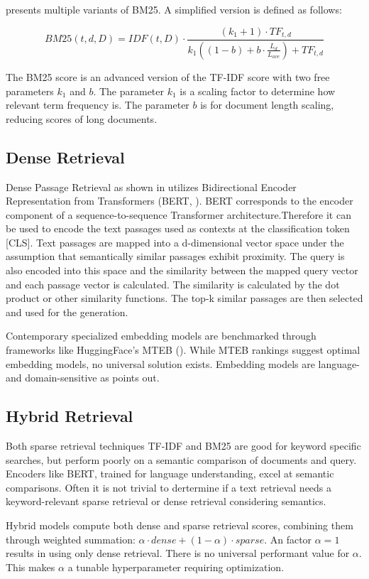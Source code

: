 \citet{Manning.2009} presents multiple variants of BM25. A simplified version is defined as follows:

$$BM25(t, d, D) = IDF(t, D) \cdot \frac{(k_1 + 1) \cdot TF_{t, d}}{k_1((1-b)+b \cdot \frac{L_d}{L_{ave}}) + TF_{t, d}}$$


The BM25 score is an advanced version of the TF-IDF score with two free parameters $k_1$ and $b$. The parameter $k_1$ is a scaling factor to determine how relevant term frequency is. The parameter $b$ is for document length scaling, reducing scores of long documents. 

\subsection{Dense Retrieval}
\label{sec:dense_retrieval}

Dense Passage Retrieval as shown in \citet{karpukhin2020densepassageretrievalopendomain} utilizes Bidirectional Encoder Representation from Transformers (BERT, \citet{devlin2019bertpretrainingdeepbidirectional}). BERT corresponds to the encoder component of a sequence-to-sequence Transformer architecture.Therefore it can be used to encode the text passages used as contexts at the classification token [CLS]. Text passages are mapped into a d-dimensional vector space under the assumption that semantically similar passages exhibit proximity. The query is also encoded into this space and the similarity between the mapped query vector and each passage vector is calculated. The similarity is calculated by the dot product or other similarity functions. The top-k similar passages are then selected and used for the generation.

Contemporary specialized embedding models are benchmarked through frameworks like HuggingFace's MTEB (\citet{muennighoff2022mteb}). While MTEB rankings suggest optimal embedding models, no universal solution exists. Embedding models are language- and domain-sensitive as \citet{Gao.18.12.2023} points out. 

\subsection{Hybrid Retrieval}
\label{sec:hybrid_retrieval}

Both sparse retrieval techniques TF-IDF and BM25 are good for keyword specific searches, but perform poorly on a semantic comparison of documents and query. Encoders like BERT, trained for language understanding, excel at semantic comparisons. Often it is not trivial to dertermine if a text retrieval needs a keyword-relevant sparse retrieval or dense retrieval considering semantics. 

Hybrid models compute both dense and sparse retrieval scores, combining them through weighted summation: 
$\alpha \cdot dense+(1 - \alpha )\cdot sparse$. An factor $\alpha=1$ results in using only dense retrieval. There is no universal performant value for $\alpha$. This makes $\alpha$ a tunable hyperparameter requiring optimization.